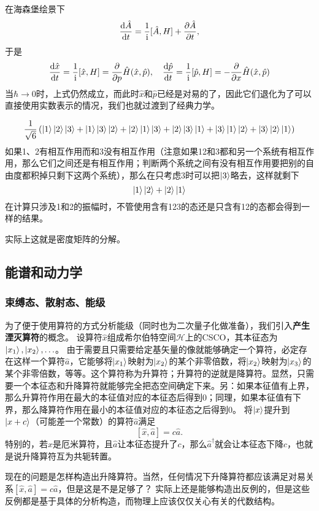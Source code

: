 \documentclass[UTF8, a4paper]{ctexart}
\newcommand*{\ii}{\mathrm{i}}
\begin{document}
在海森堡绘景下
\[
    \dv{\hat{A}}{t} = \frac{1}{\ii} [\hat{A}, H] + \pdv{\hat{A}}{t},
\]
于是
\[
    \dv{\hat{x}}{t} = \frac{1}{\ii} [\hat{x}, H] = \pdv{p} \hat{H}(\hat{x}, \hat{p}), \quad
    \dv{\hat{p}}{t} = \frac{1}{\ii} [\hat{p}, H] = -\pdv{x} \hat{H}(\hat{x}, \hat{p})
\]
当$\hbar \to 0$时，上式仍然成立，而此时$\hat{x}$和$\hat{p}$已经是对易的了，因此它们退化为了可以直接使用实数表示的情况，我们也就过渡到了经典力学。

\[
    \frac{1}{\sqrt{6}} \left( \ket{1}\ket{2}\ket{3} + \ket{1}\ket{3}\ket{2} + \ket{2}\ket{1}\ket{3} + \ket{2}\ket{3}\ket{1} + \ket{3}\ket{1}\ket{2} + \ket{3}\ket{2}\ket{1}
    \right)
\]
如果1、2有相互作用而和3没有相互作用（注意如果12和3都和另一个系统有相互作用，那么它们之间还是有相互作用；判断两个系统之间有没有相互作用要把别的自由度都积掉只剩下这两个系统），那么在只考虑3时可以把$\ket{3}$略去，这样就剩下
\[
    \ket{1}\ket{2} + \ket{2}\ket{1}
\]
在计算只涉及1和2的振幅时，不管使用含有123的态还是只含有12的态都会得到一样的结果。

实际上这就是密度矩阵的分解。

\subsection{能谱和动力学}

\subsubsection{束缚态、散射态、能级}

为了便于使用算符的方式分析能级（同时也为二次量子化做准备），我们引入\textbf{产生湮灭算符}的概念。
设算符$\hat{x}$组成希尔伯特空间$\mathcal{H}$上的CSCO，其本征态为$\ket{x_1}, \ket{x_2}, \ldots$。
由于需要且只需要给定基矢量的像就能够确定一个算符，必定存在这样一个算符$\hat{a}$，它能够将$\ket{x_1}$映射为$\ket{x_2}$的某个非零倍数，将$\ket{x_2}$映射为$\ket{x_3}$的某个非零倍数，等等。这个算符称为升算符；升算符的逆就是降算符。显然，只需要一个本征态和升降算符就能够完全把态空间确定下来。另：如果本征值有上界，那么升算符作用在最大的本征值对应的本征态后得到$0$；同理，如果本征值有下界，那么降算符作用在最小的本征值对应的本征态之后得到$0$。
将$\ket{x}$提升到$\ket{x+c}$（可能差一个常数）的算符$\hat{a}$满足
\[
    [\hat{x}, \hat{a}] = c \hat{a}.
\]
特别的，若$\hat{x}$是厄米算符，且$\hat{a}$让本征态提升了$c$，那么$\hat{a}^\dagger$就会让本征态下降$c$，也就是说升降算符互为共轭转置。

现在的问题是怎样构造出升降算符。当然，任何情况下升降算符都应该满足对易关系$[\hat{x}, \hat{a}] = c \hat{a}$，但是这是不是足够了？
实际上还是能够构造出反例的，但是这些反例都是基于具体的分析构造，而物理上应该仅仅关心有关的代数结构。
\end{document}
